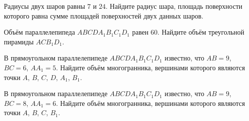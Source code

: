 Радиусы двух шаров равны \(7\) и \(24\). Найдите радиус шара, площадь
поверхности которого равна сумме площадей поверхностей двух данных шаров.

Объём параллелепипеда \(ABCDA_1B_1C_1D_1\) равен \(60\). Найдите объём
треугольной пирамиды \(ACB_1D_1\).

В прямоугольном параллелепипеде \(ABCDA_1B_1C_1D_1\) известно, что \(AB=9\),
\(BC=6\), \(AA_1=5\). Найдите объём многогранника, вершинами которого являются
точки \(A\), \(B\), \(C\), \(D\), \(A_1\), \(B_1\).

В прямоугольном параллелепипеде \(ABCDA_1B_1C_1D_1\) известно, что \(AB=9\),
\(BC=8\), \(AA_1=6\). Найдите объём многогранника, вершинами которого являются
точки \(A\), \(B\), \(C\), \(B_1\).
